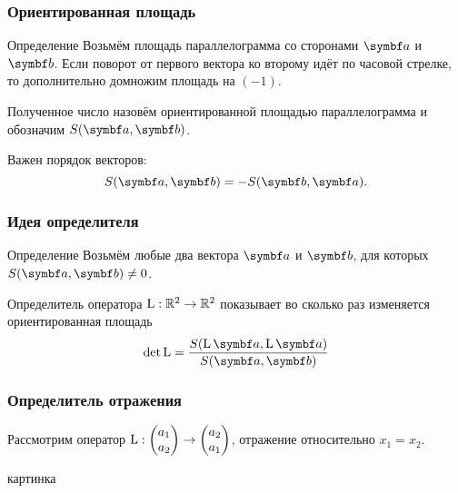 \begin{frame}
    \frametitle{Ориентированная площадь}


    \begin{block}{Определение}
        Возьмём площадь параллелограмма со сторонами $\ba$ и $\bb$.
        Если поворот от первого вектора ко второму идёт по часовой стрелке, то дополнительно домножим площадь на $(-1)$.

        Полученное число назовём \alert{ориентированной площадью} параллелограмма и обозначим $S(\ba, \bb)$.    
    \end{block}

    \pause

    Важен порядок векторов: 
    \[
        S(\ba, \bb) = - S(\bb, \ba).  
    \]



    
\end{frame}



\begin{frame}
    \frametitle{Идея определителя}

\begin{block}{Определение}
    Возьмём любые два вектора $\ba$ и $\bb$, для которых $S(\ba, \bb)\neq 0$.

    \alert{Определитель} оператора $\operatorname{L}:\mathbb{R}^2 \to \mathbb{R}^2$ показывает во сколько раз изменяется
    ориентированная площадь
    \[
    \det \LL = \frac{S(\LL\ba, \LL\ba)}{S(\ba, \bb)}    
    \]
\end{block}    
    

\end{frame}




\begin{frame}
    \frametitle{Определитель отражения}


    Рассмотрим оператор $\operatorname{L} : \begin{pmatrix}
      a_1 \\
      a_2 \\
    \end{pmatrix} \to 
    \begin{pmatrix}
      a_2 \\
      a_1 \\
    \end{pmatrix}$, отражение относительно $x_1= x_2$.
    

    \pause

    картинка

\end{frame}


